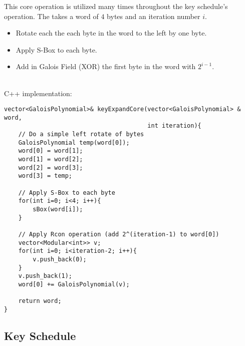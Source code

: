 \documentclass{article}
\begin{document}
This core operation is utilized many times throughout the key schedule's operation.  The takes a word of $4$ bytes and an iteration number $i$.\\
\begin{itemize}
\item Rotate each the each byte in the word to the left by one byte.
\item Apply S-Box to each byte.
\item Add in Galois Field (XOR) the first byte in the word with $2^{i-1}$.
\end{itemize}
\hfill\\
C++ implementation:
\begin{lstlisting}
vector<GaloisPolynomial>& keyExpandCore(vector<GaloisPolynomial> & word,
                                        int iteration){
    // Do a simple left rotate of bytes
    GaloisPolynomial temp(word[0]);
    word[0] = word[1];
    word[1] = word[2];
    word[2] = word[3];
    word[3] = temp;
    
    // Apply S-Box to each byte
    for(int i=0; i<4; i++){
        sBox(word[i]);
    }
    
    // Apply Rcon operation (add 2^(iteration-1) to word[0])
    vector<Modular<int>> v;
    for(int i=0; i<iteration-2; i++){
        v.push_back(0);
    }
    v.push_back(1);
    word[0] += GaloisPolynomial(v);
    
    return word;
}
\end{lstlisting}

\subsection{Key Schedule}
\end{document}
